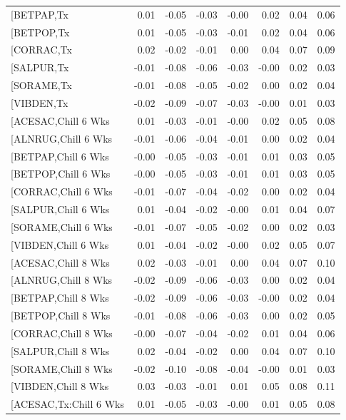 \documentclass{article}\usepackage[]{graphicx}\usepackage[]{color}
\begin{document}
\begin{longtable}{lrrrrrrr}
  [BETPAP,Tx & 0.01 & -0.05 & -0.03 & -0.00 & 0.02 & 0.04 & 0.06 \\ 
  [BETPOP,Tx & 0.01 & -0.05 & -0.03 & -0.01 & 0.02 & 0.04 & 0.06 \\ 
  [CORRAC,Tx & 0.02 & -0.02 & -0.01 & 0.00 & 0.04 & 0.07 & 0.09 \\ 
  [SALPUR,Tx & -0.01 & -0.08 & -0.06 & -0.03 & -0.00 & 0.02 & 0.03 \\ 
  [SORAME,Tx & -0.01 & -0.08 & -0.05 & -0.02 & 0.00 & 0.02 & 0.04 \\ 
  [VIBDEN,Tx & -0.02 & -0.09 & -0.07 & -0.03 & -0.00 & 0.01 & 0.03 \\ 
  [ACESAC,Chill 6 Wks & 0.01 & -0.03 & -0.01 & -0.00 & 0.02 & 0.05 & 0.08 \\ 
  [ALNRUG,Chill 6 Wks & -0.01 & -0.06 & -0.04 & -0.01 & 0.00 & 0.02 & 0.04 \\ 
  [BETPAP,Chill 6 Wks & -0.00 & -0.05 & -0.03 & -0.01 & 0.01 & 0.03 & 0.05 \\ 
  [BETPOP,Chill 6 Wks & -0.00 & -0.05 & -0.03 & -0.01 & 0.01 & 0.03 & 0.05 \\ 
  [CORRAC,Chill 6 Wks & -0.01 & -0.07 & -0.04 & -0.02 & 0.00 & 0.02 & 0.04 \\ 
  [SALPUR,Chill 6 Wks & 0.01 & -0.04 & -0.02 & -0.00 & 0.01 & 0.04 & 0.07 \\ 
  [SORAME,Chill 6 Wks & -0.01 & -0.07 & -0.05 & -0.02 & 0.00 & 0.02 & 0.03 \\ 
  [VIBDEN,Chill 6 Wks & 0.01 & -0.04 & -0.02 & -0.00 & 0.02 & 0.05 & 0.07 \\ 
  [ACESAC,Chill 8 Wks & 0.02 & -0.03 & -0.01 & 0.00 & 0.04 & 0.07 & 0.10 \\ 
  [ALNRUG,Chill 8 Wks & -0.02 & -0.09 & -0.06 & -0.03 & 0.00 & 0.02 & 0.04 \\ 
  [BETPAP,Chill 8 Wks & -0.02 & -0.09 & -0.06 & -0.03 & -0.00 & 0.02 & 0.04 \\ 
  [BETPOP,Chill 8 Wks & -0.01 & -0.08 & -0.06 & -0.03 & 0.00 & 0.02 & 0.05 \\ 
  [CORRAC,Chill 8 Wks & -0.00 & -0.07 & -0.04 & -0.02 & 0.01 & 0.04 & 0.06 \\ 
  [SALPUR,Chill 8 Wks & 0.02 & -0.04 & -0.02 & 0.00 & 0.04 & 0.07 & 0.10 \\ 
  [SORAME,Chill 8 Wks & -0.02 & -0.10 & -0.08 & -0.04 & -0.00 & 0.01 & 0.03 \\ 
  [VIBDEN,Chill 8 Wks & 0.03 & -0.03 & -0.01 & 0.01 & 0.05 & 0.08 & 0.11 \\ 
  [ACESAC,Tx:Chill 6 Wks & 0.01 & -0.05 & -0.03 & -0.00 & 0.01 & 0.05 & 0.08 \\ 

\end{longtable}
\end{document}
